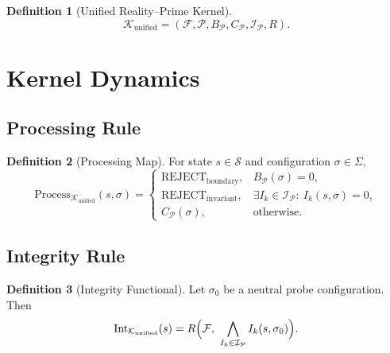\documentclass[12pt]{article}
\theoremstyle{definition}
\newtheorem{definition}{Definition}[section]
\theoremstyle{plain}
\begin{document}
\begin{definition}[Unified Reality--Prime Kernel]
\[
\mathcal{K}_{\mathrm{unified}} =
(\mathcal{F}, \mathcal{P}, B_{\mathcal{P}}, C_{\mathcal{P}}, \mathcal{I}_{\mathcal{P}}, R).
\]
\end{definition}

\section{Kernel Dynamics}

\subsection{Processing Rule}

\begin{definition}[Processing Map]
For state \(s\in\mathcal{S}\) and configuration \(\sigma\in\Sigma\),
\[
\mathrm{Process}_{\mathcal{K}_{\mathrm{unified}}}(s,\sigma)=
\begin{cases}
\mathrm{REJECT}_{\mathrm{boundary}}, & B_{\mathcal{P}}(\sigma)=0,\\[4pt]
\mathrm{REJECT}_{\mathrm{invariant}}, & \exists I_k\in\mathcal{I}_{\mathcal{P}}:\ I_k(s,\sigma)=0,\\[4pt]
C_{\mathcal{P}}(\sigma), & \text{otherwise}.
\end{cases}
\]
\end{definition}

\subsection{Integrity Rule}

\begin{definition}[Integrity Functional]
Let \(\sigma_0\) be a neutral probe configuration. Then
\[
\mathrm{Int}_{\mathcal{K}_{\mathrm{unified}}}(s) =
R\Bigl(\mathcal{F},\ \bigwedge_{I_k \in \mathcal{I}_{\mathcal{P}}} I_k(s,\sigma_0)\Bigr).
\]
\end{definition}
\end{document}
